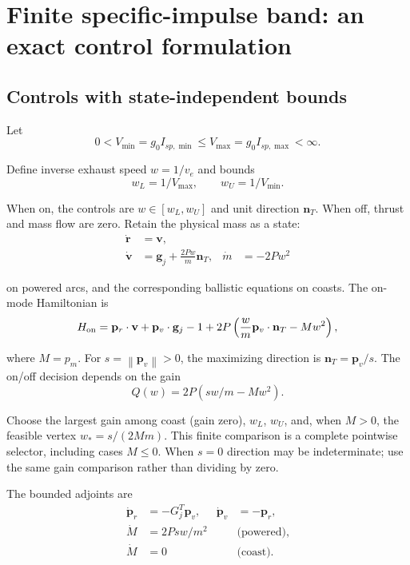 \documentclass[journal, a4paper]{IEEEtran}
\newcommand{\norm}[1]{\left\lVert#1\right\rVert}
\begin{document}
\section{Finite specific-impulse band: an exact control formulation}
\subsection{Controls with state-independent bounds}
Let
\begin{equation}
 0<V_{\min}=g_0I_{sp,\min}\le V_{\max}=g_0I_{sp,\max}<\infty.
\end{equation}

Define inverse exhaust speed $w=1/v_e$ and bounds
\begin{equation}
 w_L=1/V_{\max},\qquad w_U=1/V_{\min}.
\end{equation}

When on, the controls are $w\in[w_L,w_U]$ and unit direction $\mathbf n_T$. When off, thrust and mass flow are zero. Retain the physical mass as a state:
\begin{align}
 \dot{\mathbf r}&=\mathbf v,\nonumber\\
 \dot{\mathbf v}&=\mathbf g_j+\frac{2Pw}{m}\mathbf n_T,
 &\dot m&=-2Pw^2
 \label{eq:boundedstate}
\end{align}

on powered arcs, and the corresponding ballistic equations on coasts. The on-mode Hamiltonian is
\begin{equation}
 H_{\rm on}=\mathbf p_r\cdot\mathbf v+\mathbf p_v\cdot\mathbf g_j-1
 +2P\left(\frac{w}{m}\mathbf p_v\cdot\mathbf n_T-Mw^2\right),
\end{equation}

where $M=p_m$. For $s=\norm{\mathbf p_v}>0$, the maximizing direction is $\mathbf n_T=\mathbf p_v/s$. The on/off decision depends on the gain
\begin{equation}
 Q(w)=2P(sw/m-Mw^2).
 \label{eq:gain}
\end{equation}

Choose the largest gain among coast (gain zero), $w_L$, $w_U$, and, when $M>0$, the feasible vertex $w_*=s/(2Mm)$. This finite comparison is a complete pointwise selector, including cases $M\le0$. When $s=0$ direction may be indeterminate; use the same gain comparison rather than dividing by zero.

The bounded adjoints are
\begin{align}
 \dot{\mathbf p}_r&=-G_j^T\mathbf p_v,&
 \dot{\mathbf p}_v&=-\mathbf p_r,\nonumber\\
 \dot M&=2Psw/m^2 &&\text{(powered)},\label{eq:boundedp}\\
 \dot M&=0 &&\text{(coast)}.\nonumber
\end{align}
\end{document}
